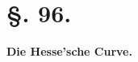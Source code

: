\documentclass[12pt,a4paper]{article}
\theoremstyle{definition}
\begin{document}
\newpage
\section*{\S. 96.}

\begin{center}
\textbf{Die Hesse'sche Curve.}
\end{center}
\end{document}
